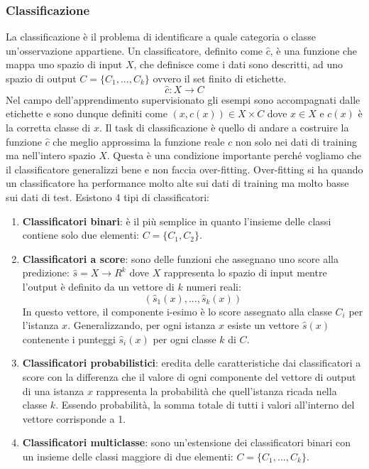 \subsubsection{Classificazione}
La classificazione è il problema di identificare a quale categoria o classe un'osservazione appartiene. Un classificatore, definito come \(\hat{c}\), è una funzione che mappa uno spazio di input \(X\), che definisce come i dati sono descritti, ad uno spazio di output \(C=\{C_1,...,C_k\}\) ovvero il set finito di etichette.
\[\hat{c}: X \rightarrow C\]
Nel campo dell'apprendimento supervisionato gli esempi sono accompagnati dalle etichette e sono dunque definiti come \((x,c(x))\in X\times C\) dove \(x \in X\) e \(c(x)\) è la corretta classe di \(x\). Il task di classificazione è quello di andare a costruire la funzione \(\hat{c}\) che meglio approssima la funzione reale \(c\) non solo nei dati di training ma nell'intero spazio \(X\). Questa è una condizione importante perché vogliamo che il classificatore generalizzi bene e non faccia over-fitting. Over-fitting si ha quando un classificatore ha performance molto alte sui dati di training ma molto basse sui dati di test.
Esistono 4 tipi di classificatori:
\begin{enumerate}
\item \textbf{Classificatori binari}: è il più semplice in quanto l'insieme delle classi contiene solo due elementi: \(C=\{C_1,C_2\}\).
\item \textbf{Classificatori a score}: sono delle funzioni che assegnano uno score alla predizione: \(\hat{s} = X\rightarrow R^k\) dove \(X\) rappresenta lo spazio di input mentre l'output è definito da un vettore di \(k\) numeri reali: 
\[(\hat{s}_1 (x),...,\hat{s}_k(x))\]
In questo vettore, il componente i-esimo è lo score assegnato alla classe \(C_i\) per l'istanza \(x\). Generalizzando, per ogni istanza \(x\) esiste un vettore \(\hat{s}(x)\) contenente i punteggi \(\hat{s}_i(x)\) per ogni classe \(k\) di \(C\).
\item \textbf{Classificatori probabilistici}: eredita delle caratteristiche dai classificatori a score con la differenza che il valore di ogni componente del vettore di output di una istanza \(x\) rappresenta la probabilità che quell'istanza ricada nella classe \(k\). Essendo probabilità, la somma totale di tutti i valori all'interno del vettore corrisponde a 1.
\item \textbf{Classificatori multiclasse}: sono un'estensione dei classificatori binari con un insieme delle classi maggiore di due elementi: \(C=\{C_1,...,C_k\}\). 
\end{enumerate}

